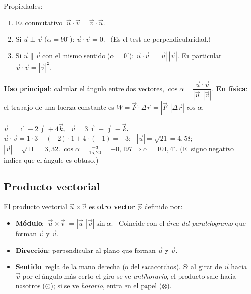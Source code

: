 \documentclass[11pt,a4paper]{article}
\newcommand{\ii}{\vec{\imath}}
\newcommand{\jj}{\vec{\jmath}}
\newcommand{\kk}{\vec{k}}
\begin{document}
Propiedades:
\begin{enumerate}[itemsep=1pt]
  \item Es conmutativo: $\vec u\cdot\vec v=\vec v\cdot\vec u$.
  \item Si $\vec u\perp\vec v$ ($\alpha=90^\circ$): $\vec u\cdot\vec v=0$. \ (Es el test de perpendicularidad.)
  \item Si $\vec u\parallel\vec v$ con el mismo sentido ($\alpha=0^\circ$): $\vec u\cdot\vec v=|\vec u|\,|\vec v|$. En particular $\vec v\cdot\vec v=|\vec v|^2$.
\end{enumerate}
\textbf{Uso principal}: calcular el ángulo entre dos vectores, $\cos\alpha=\dfrac{\vec u\cdot\vec v}{|\vec u|\,|\vec v|}$. \textbf{En física}: el trabajo de una fuerza constante es $W=\vec F\cdot\Delta\vec r=|\vec F|\,|\Delta\vec r|\cos\alpha$.

\begin{ejemplo}
$\vec u=\ii-2\jj+4\kk$, \ $\vec v=3\ii+\jj-\kk$.
$\vec u\cdot\vec v=1\cdot3+(-2)\cdot1+4\cdot(-1)=-3$; \ $|\vec u|=\sqrt{21}=4{,}58$; \ $|\vec v|=\sqrt{11}=3{,}32$.
$\cos\alpha=\frac{-3}{15{,}20}=-0{,}197\Rightarrow\alpha=101{,}4^\circ$. (El signo negativo indica que el ángulo es obtuso.)
\end{ejemplo}

\subsection{Producto vectorial}
El producto vectorial $\vec u\times\vec v$ es \textbf{otro vector} $\vec p$ definido por:
\begin{itemize}[itemsep=2pt]
  \item \textbf{Módulo}: $|\vec u\times\vec v|=|\vec u|\,|\vec v|\sin\alpha$. \ Coincide con el \emph{área del paralelogramo} que forman $\vec u$ y $\vec v$.
  \item \textbf{Dirección}: perpendicular al plano que forman $\vec u$ y $\vec v$.
  \item \textbf{Sentido}: regla de la mano derecha (o del sacacorchos). Si al girar de $\vec u$ hacia $\vec v$ por el ángulo más corto el giro se ve \emph{antihorario}, el producto sale hacia nosotros ($\odot$); si se ve \emph{horario}, entra en el papel ($\otimes$).
\end{itemize}
\end{document}
